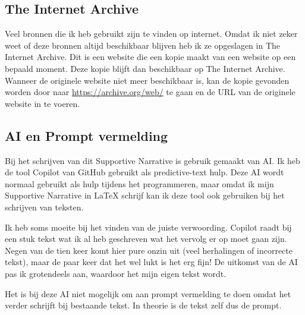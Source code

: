 

\subsection*{The Internet Archive}
Veel bronnen die ik heb gebruikt zijn te vinden op internet. Omdat ik niet zeker weet of deze bronnen altijd beschikbaar blijven heb ik ze opgeslagen in The Internet Archive. Dit is een website die een kopie maakt van een website op een bepaald moment. Deze kopie blijft dan beschikbaar op The Internet Archive. Wanneer de originele website niet meer beschikbaar is, kan de kopie gevonden worden door naar \url{https://archive.org/web/} te gaan en de URL van de originele website in te voeren.

\subsection*{AI en Prompt vermelding}
Bij het schrijven van dit Supportive Narrative is gebruik gemaakt van AI. Ik heb de tool Copilot van GitHub gebruikt als predictive-text hulp. Deze AI wordt normaal gebruikt als hulp tijdens het programmeren, maar omdat ik mijn Supportive Narrative in LaTeX schrijf kan ik deze tool ook gebruiken bij het schrijven van teksten.

Ik heb soms moeite bij het vinden van de juiste verwoording. Copilot raadt bij een stuk tekst wat ik al heb geschreven wat het vervolg er op moet gaan zijn. Negen van de tien keer komt hier pure onzin uit (veel herhalingen of incorrecte tekst), maar de paar keer dat het wel lukt is het erg fijn! De uitkomst van de AI pas ik grotendeels aan, waardoor het mijn eigen tekst wordt.

Het is bij deze AI niet mogelijk om aan prompt vermelding te doen omdat het verder schrijft bij bestaande tekst. In theorie is de tekst zelf dus de prompt. 

